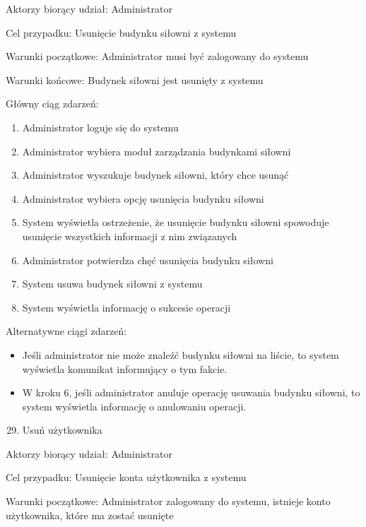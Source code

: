 \documentclass[
]{article}
\providecommand{\tightlist}{%
  \setlength{\itemsep}{0pt}\setlength{\parskip}{0pt}}
\begin{document}
{Aktorzy biorący udział: Administrator}

{Cel przypadku: Usunięcie budynku siłowni z systemu}

{Warunki początkowe: Administrator musi być zalogowany do systemu}

{Warunki końcowe: Budynek siłowni jest usunięty z systemu}

{Główny ciąg zdarzeń:}

\begin{enumerate}
\tightlist
\item
  {Administrator loguje się do systemu}
\item
  {Administrator wybiera moduł zarządzania budynkami siłowni}
\item
  {Administrator wyszukuje budynek siłowni, który chce usunąć}
\item
  {Administrator wybiera opcję usunięcia budynku siłowni}
\item
  {System wyświetla ostrzeżenie, że usunięcie budynku siłowni spowoduje
  usunięcie wszystkich informacji z nim związanych}
\item
  {Administrator potwierdza chęć usunięcia budynku siłowni}
\item
  {System usuwa budynek siłowni z systemu}
\item
  {System wyświetla informację o sukcesie operacji}
\end{enumerate}

{Alternatywne ciągi zdarzeń:}

\begin{itemize}
\tightlist
\item
  {Jeśli administrator nie może znaleźć budynku siłowni na liście, to
  system wyświetla komunikat informujący o tym fakcie. }
\item
  {W kroku 6, jeśli administrator anuluje operację usuwania budynku
  siłowni, to system wyświetla informację o anulowaniu operacji.}
\end{itemize}

{}

\begin{enumerate}
\setcounter{enumi}{28}
\tightlist
\item
  {Usuń użytkownika}
\end{enumerate}

{Aktorzy biorący udział: Administrator}

{Cel przypadku: Usunięcie konta użytkownika z systemu}

{Warunki początkowe: Administrator zalogowany do systemu, istnieje konto
użytkownika, które ma zostać usunięte}
\end{document}
